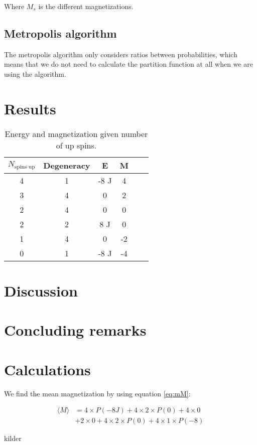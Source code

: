 \documentclass{article}
\begin{document}
\begin{multicols}{2}
Where $M_s$ is the different magnetizations. 

\subsection{Metropolis algorithm}

The metropolis algorithm only considers ratios between probabilities, which means that we do not need to calculate the partition function at all when we are using the algorithm. 

\section{Results}

\begin{table}[H]
\begin{center}
\caption{Energy and magnetization given number of up spins.}
\begin{tabular}{  |c|c|c|c|c|c| } \hline
$N_{\text{spins up}}$&Degeneracy&E&M \\ \hline
4&1&-8 J&4\\ \hline
3&4&0 &2 \\ \hline
2&4&0&0\\ \hline
2&2&8 J&0\\ \hline
1&4&0&-2\\ \hline
0&1&-8 J&-4\\ \hline
\end{tabular}
\label{tab:up_spins}
\end{center}
\end{table}

\section{Discussion}

\section{Concluding remarks}

\end{multicols}

\clearpage
\appendix \section{Calculations} %

We find the mean magnetization by using equation \ref{eq:mM}:

\begin{equation} \label{eq1}
\begin{split}
\langle M \rangle& = 4 \times P(-8J) + 4 \times 2 \times P(0) + 4 \times 0 \\
& + 2\times0+4 \times 2 \times P(0) + 4 \times 1 \times P(-8)
\end{split}
\end{equation}



\begin{thebibliography}{9}
	kilder
\end{thebibliography}
\end{document}
